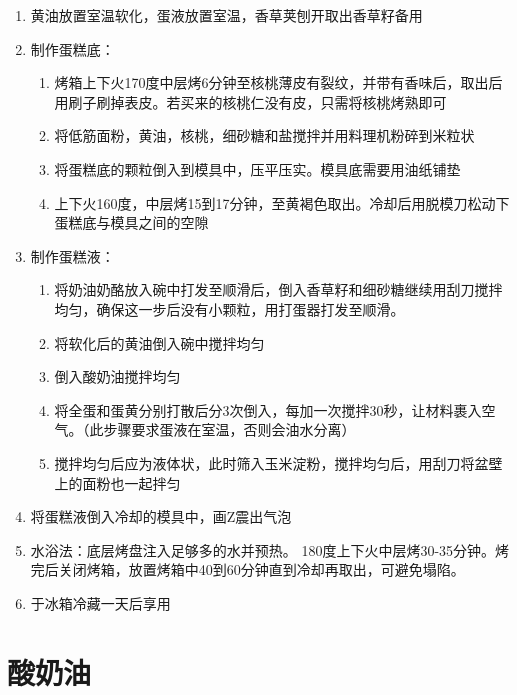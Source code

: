 \begin{enumerate}
    \item 黄油放置室温软化，蛋液放置室温，香草荚刨开取出香草籽备用
    \item 制作蛋糕底：
    \begin{enumerate}
    \item 烤箱上下火170度中层烤6分钟至核桃薄皮有裂纹，并带有香味后，取出后用刷子刷掉表皮。若买来的核桃仁没有皮，只需将核桃烤熟即可
    \item 将低筋面粉，黄油，核桃，细砂糖和盐搅拌并用料理机粉碎到米粒状
    \item 将蛋糕底的颗粒倒入到模具中，压平压实。模具底需要用油纸铺垫
    \item 上下火160度，中层烤15到17分钟，至黄褐色取出。冷却后用脱模刀松动下蛋糕底与模具之间的空隙
    \end{enumerate}
 
    \item 制作蛋糕液：
    \begin{enumerate}
    \item 将奶油奶酪放入碗中打发至顺滑后，倒入香草籽和细砂糖继续用刮刀搅拌均匀，确保这一步后没有小颗粒，用打蛋器打发至顺滑。
    \item 将软化后的黄油倒入碗中搅拌均匀
    \item 倒入酸奶油搅拌均匀
    \item 将全蛋和蛋黄分别打散后分3次倒入，每加一次搅拌30秒，让材料裹入空气。（此步骤要求蛋液在室温，否则会油水分离）
    \item 搅拌均匀后应为液体状，此时筛入玉米淀粉，搅拌均匀后，用刮刀将盆壁上的面粉也一起拌匀
    \end{enumerate}
    \item 将蛋糕液倒入冷却的模具中，画Z震出气泡
    \item 水浴法：底层烤盘注入足够多的水并预热。 180度上下火中层烤30-35分钟。烤完后关闭烤箱，放置烤箱中40到60分钟直到冷却再取出，可避免塌陷。
    \item 于冰箱冷藏一天后享用
\end{enumerate}



\section{酸奶油}

